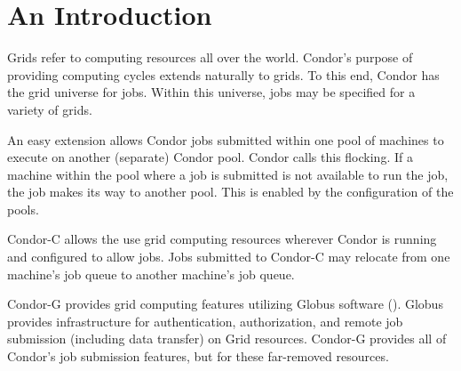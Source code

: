 \section{\label{sec:grids-intro}An Introduction}

Grids refer to computing resources all over the world. 
Condor's purpose of providing computing cycles extends naturally
to grids.
To this end, Condor has the grid universe for jobs.
Within this universe, jobs may be specified for a variety
of grids.

An easy extension allows Condor jobs submitted within one pool
of machines to execute on another (separate) Condor pool.
Condor calls this flocking.
If a machine within the pool where a job is submitted is not
available to run the job,
the job makes its way to another pool.
This is enabled by the configuration of the pools.

Condor-C allows the use grid computing resources
wherever Condor is running and configured to allow
jobs.
Jobs submitted to Condor-C may relocate from one machine's
job queue to another machine's job queue.

Condor-G provides
grid computing features utilizing Globus software
().
Globus provides infrastructure for authentication, authorization,
and remote job submission (including data transfer) on Grid resources.
Condor-G provides all of Condor's job submission features,
but for these far-removed resources.

